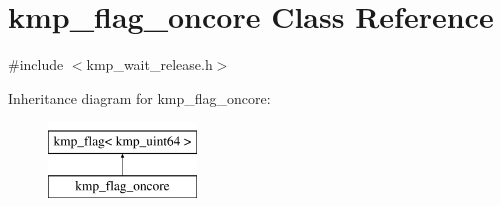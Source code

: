 \hypertarget{classkmp__flag__oncore}{\section{kmp\-\_\-flag\-\_\-oncore Class Reference}
\label{classkmp__flag__oncore}
}


{\ttfamily \#include $<$kmp\-\_\-wait\-\_\-release.\-h$>$}

Inheritance diagram for kmp\-\_\-flag\-\_\-oncore\-:\begin{figure}[H]
\begin{center}
\leavevmode
\includegraphics[height=2.000000cm]{classkmp__flag__oncore}
\end{center}
\end{figure}
